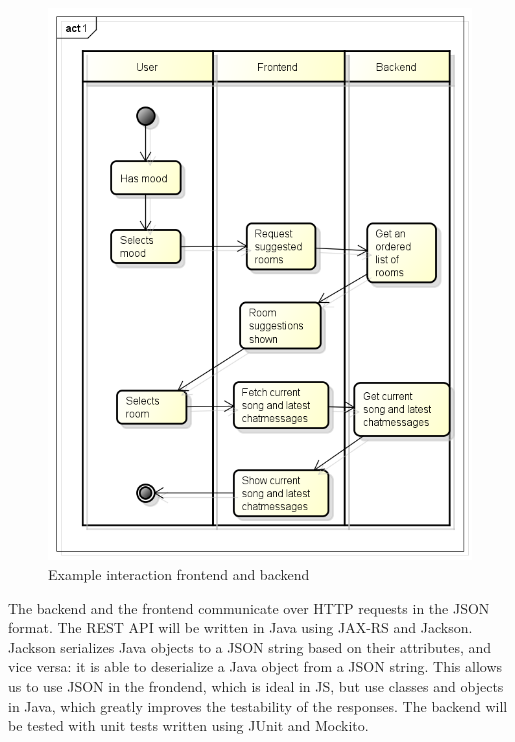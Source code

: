 \begin{figure}[H]
\includegraphics[scale=.4]{backendInteraction.png}
\caption{Example interaction frontend and backend}
\label{fig: backendInteraction}
\end{figure}


\par
The backend and the frontend communicate over \Gls{HTTP} requests in the \Gls{JSON} format.
The REST API will be written in Java using JAX-RS and Jackson.
Jackson serializes Java objects to a JSON string based on their attributes, and vice versa: it is able to deserialize a Java object from a JSON string.
This allows us to use JSON in the frondend, which is ideal in \Gls{JS}, but use classes and objects in Java, which greatly improves the testability of the responses.
The backend will be tested with unit tests written using JUnit and Mockito.

